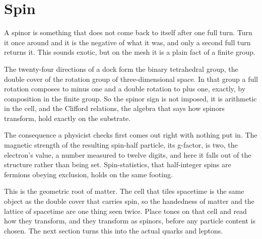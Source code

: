 \section{Spin}

A spinor is something that does not come back to itself after one full turn. Turn it once around and it is the negative
of what it was, and only a second full turn returns it. This sounds exotic, but on the mesh it is a plain fact of a
finite group.

The twenty-four directions of a dock form the binary tetrahedral group, the double cover of the rotation group of
three-dimensional space. In that group a full rotation composes to minus one and a double rotation to plus one, exactly,
by composition in the finite group. So the spinor sign is not imposed, it is arithmetic in the cell, and the Clifford
relations, the algebra that says how spinors transform, hold exactly on the substrate.

The consequence a physicist checks first comes out right with nothing put in. The magnetic strength of the resulting
spin-half particle, its g-factor, is two, the electron's value, a number measured to twelve digits, and here it falls
out of the structure rather than being set. Spin-statistics, that half-integer spins are fermions obeying exclusion,
holds on the same footing.

This is the geometric root of matter. The cell that tiles spacetime is the same object as the double cover that carries
spin, so the handedness of matter and the lattice of spacetime are one thing seen twice. Place tones on that cell and
read how they transform, and they transform as spinors, before any particle content is chosen. The next section turns
this into the actual quarks and leptons.
